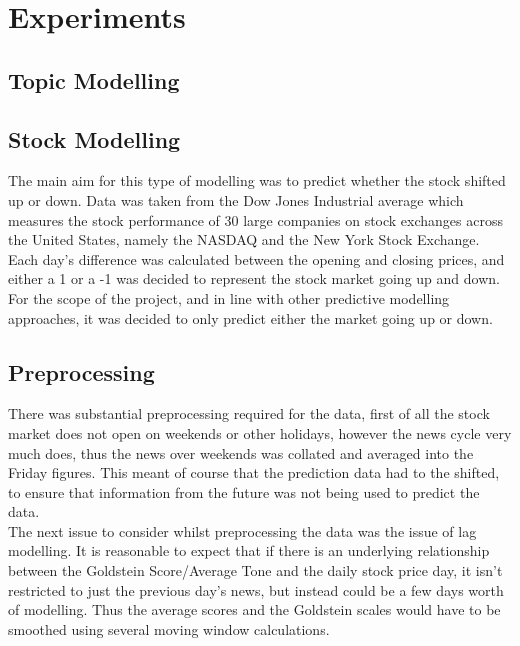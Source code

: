 \section{Experiments}

\subsection{Topic Modelling}


\subsection{Stock Modelling}

The main aim for this type of modelling was to predict whether the stock shifted up or down. Data was taken from the Dow Jones Industrial average which measures the stock performance of 30 large companies on stock exchanges across the United States, namely the NASDAQ and the New York Stock Exchange. Each day's difference was calculated between the opening and closing prices, and either a 1 or a -1 was decided to represent the stock market going up and down. For the scope of the project, and in line with other predictive modelling approaches, it was decided to only predict either the market going up or down. \\


\subsection{Preprocessing}
There was substantial preprocessing required for the data, first of all the stock market does not open on weekends or other holidays, however the news cycle very much does, thus the news over weekends was collated and averaged into the Friday figures. This meant of course that the prediction data had to the shifted, to ensure that information from the future was not being used to predict the data.\\

The next issue to consider whilst preprocessing the data was the issue of lag modelling. It is reasonable to expect that if there is an underlying relationship between the Goldstein Score/Average Tone and the daily stock price day, it isn't restricted to just the previous day's news, but instead could be a few days worth of modelling. Thus the average scores and the Goldstein scales would have to be smoothed using several moving window calculations.



